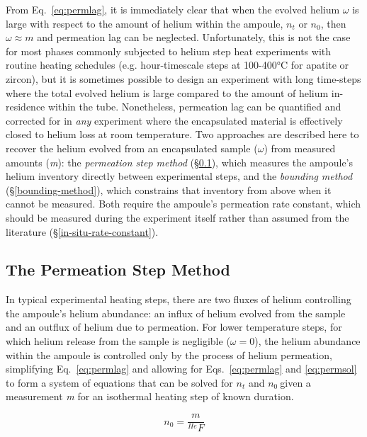 From Eq.~\eqref{eq:permlag}, it is immediately clear that when the evolved helium \(\omega\) is large with respect to the amount of helium within the ampoule, \(n_{t}\) or \(n_{0}\), then \(\omega \approx m\) and permeation lag can be neglected. Unfortunately, this is not the case for most phases commonly subjected to helium step heat experiments with routine heating schedules (e.g. hour-timescale steps at 100-400°C for apatite or zircon), but it is sometimes possible to design an experiment with long time-steps where the total evolved helium is large compared to the amount of helium in-residence within the tube. Nonetheless, permeation lag can be quantified and corrected for in \emph{any} experiment where the encapsulated material is effectively closed to helium loss at room temperature. Two approaches are described here to recover the helium evolved from an encapsulated sample (\(\omega\)) from measured amounts (\emph{m}): the \emph{permeation step method} (\S\ref{permeation-step-method}), which measures the ampoule's helium inventory directly between experimental steps, and the \emph{bounding method} (\S\ref{bounding-method}), which constrains that inventory from above when it cannot be measured. Both require the ampoule's permeation rate constant, which should be measured during the experiment itself rather than assumed from the literature (\S\ref{in-situ-rate-constant}).

\subsection{The Permeation Step Method}\label{permeation-step-method}

In typical experimental heating steps, there are two fluxes of helium controlling the ampoule's helium abundance: an influx of helium evolved from the sample and an outflux of helium due to permeation. For lower temperature steps, for which helium release from the sample is negligible (\(\omega = 0\)), the helium abundance within the ampoule is controlled only by the process of helium permeation, simplifying Eq.~\eqref{eq:permlag} and allowing for Eqs.~\eqref{eq:permlag} and \eqref{eq:permsol} to form a system of equations that can be solved for \(n_{t}\) and \(n_{0}\ \)given a measurement \emph{m} for an isothermal heating step of known duration.

\begin{equation}
\label{eq:n0perm}
n_{0} = \frac{m}{^{He}F}
\end{equation}

